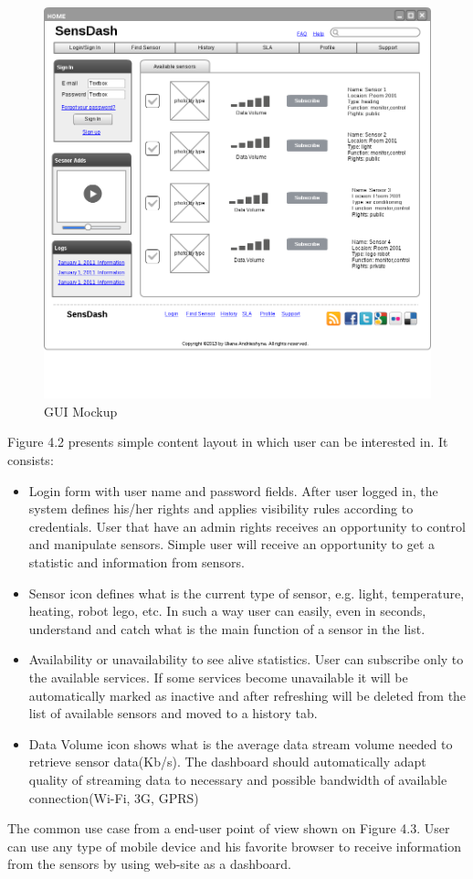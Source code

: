     \begin{figure}[!ht]
    \centering
    \includegraphics[scale=0.5]{images/Mockup.png}   
    \caption[GUI Mockup]{GUI Mockup}
    \label{img:GUI Mockup}                           
    \end{figure}
    Figure 4.2 presents simple content layout in which user can be interested in. It consists:
      \begin{itemize}
      \item Login form with user name and password fields. After user logged in, the system defines his/her rights and applies visibility rules according to credentials. User that have an admin rights receives an opportunity to control and manipulate sensors. Simple user will receive an opportunity to get a statistic and information from sensors.
      \item Sensor icon defines what is the current type of sensor, e.g. light, temperature, heating, robot lego, etc. In such a way user can easily, even in seconds, understand and catch what is the main function of a sensor in the list.
      \item Availability or unavailability to see alive statistics. User can subscribe only to the available services. If some services become unavailable it will be automatically marked as inactive and after refreshing will be deleted from the list of available sensors and moved to a history tab.
      \item Data Volume icon shows what is the average data stream volume needed to retrieve sensor data(Kb/s). The dashboard should automatically adapt quality of streaming data to necessary and possible bandwidth of available connection(Wi-Fi, 3G, GPRS)
      \end{itemize}
    The common use case from a end-user point of view shown on Figure 4.3. User can use any type of mobile device and his favorite browser to receive information from the sensors by using web-site as a dashboard.


